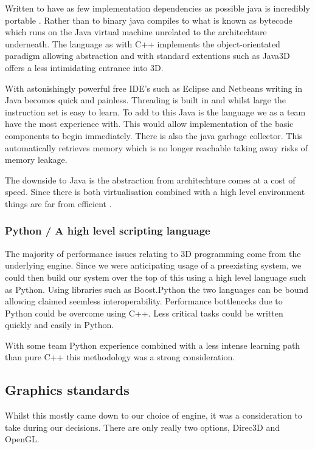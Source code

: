 Written to have as few implementation dependencies as possible java
is incredibly portable \cite{AboutJava}. Rather than to binary java
compiles to what is known as bytecode which runs on the Java virtual
machine unrelated to the architechture underneath. The language as
with C++ implements the object-orientated paradigm allowing abstraction
and with standard extentions such as Java3D offers a less intimidating
entrance into 3D.

With astonishingly powerful free IDE's such as Eclipse and Netbeans
writing in Java becomes quick and painless. Threading is built in
and whilst large the instruction set is easy to learn. To add to this
Java is the language we as a team have the most experience with. This
would allow implementation of the basic components to begin immediately.
There is also the java garbage collector. This automatically retrieves
memory which is no longer reachable taking away risks of memory leakage.

The downside to Java is the abstraction from architechture comes at
a cost of speed. Since there is both virtualisation combined with
a high level environment things are far from efficient \cite{Jelovic}. 


\subsubsection*{Python / A high level scripting language}

The majority of performance issues relating to 3D programming come
from the underlying engine. Since we were anticipating usage of a
preexisting system, we could then build our system over the top of
this using a high level language such as Python. Using libraries such
as Boost.Python \cite{boostPython} the two languages can be bound
allowing claimed seemless interoperability. Performance bottlenecks
due to Python could be overcome using C++. Less critical tasks could
be written quickly and easily in Python.

With some team Python experience combined with a less intense learning
path than pure C++ this methodology was a strong consideration.


\subsection*{Graphics standards}

Whilst this mostly came down to our choice of engine, it was a consideration
to take during our decisions. There are only really two options, Direc3D
and OpenGL.


